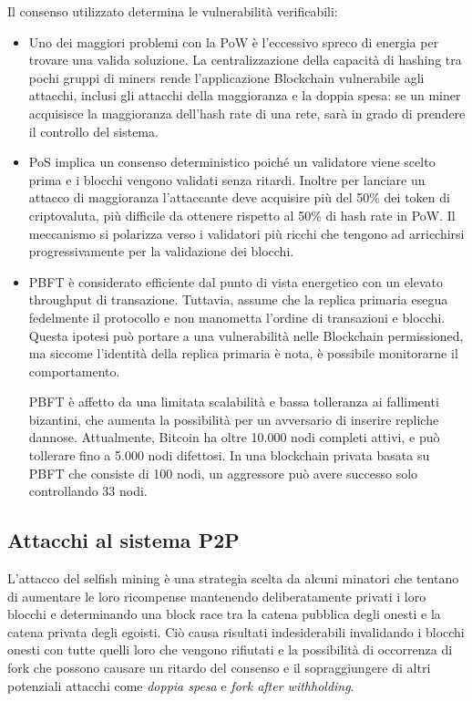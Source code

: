 Il consenso utilizzato determina le vulnerabilità verificabili:
\begin{itemize}
    \item Uno dei maggiori problemi con la PoW è l'eccessivo spreco di energia per trovare una valida soluzione. La centralizzazione della capacità di hashing tra pochi gruppi di miners rende l'applicazione Blockchain vulnerabile agli attacchi, inclusi gli attacchi della maggioranza e la doppia spesa: se un miner acquisisce la maggioranza dell'hash rate di una rete, sarà in grado di prendere il controllo del sistema.
    \item PoS implica un consenso deterministico poiché un validatore viene scelto prima e i blocchi vengono validati senza ritardi. Inoltre per lanciare un attacco di maggioranza l'attaccante deve acquisire più del 50\% dei token di criptovaluta, più difficile da ottenere rispetto al 50\% di hash rate in PoW. Il meccanismo si polarizza verso i validatori più ricchi che tengono ad arricchirsi progressivamente per la validazione dei blocchi.
    \item PBFT è considerato efficiente dal punto di vista energetico con un elevato throughput di transazione. Tuttavia, assume che la replica primaria esegua fedelmente il protocollo e non manometta l'ordine di transazioni e blocchi. Questa ipotesi può portare a una vulnerabilità nelle Blockchain permissioned, ma siccome l'identità della replica primaria è nota, è possibile monitorarne il comportamento.
    
    PBFT è affetto da una limitata scalabilità e bassa tolleranza ai fallimenti bizantini, che aumenta la possibilità per un avversario di inserire repliche dannose. Attualmente, Bitcoin ha oltre 10.000 nodi completi attivi, e può tollerare fino a 5.000 nodi difettosi. In una blockchain privata basata su PBFT che consiste di 100 nodi, un aggressore può avere successo solo controllando 33 nodi.
\end{itemize}

\subsection{Attacchi al sistema P2P}

L'attacco del selfish mining è una strategia scelta da alcuni minatori che tentano di aumentare le loro ricompense mantenendo deliberatamente privati i loro blocchi e determinando una block race tra la catena pubblica degli onesti e la catena privata degli egoisti. Ciò causa risultati indesiderabili invalidando i blocchi onesti con tutte quelli loro che vengono rifiutati e la possibilità di occorrenza di fork che possono causare un ritardo del consenso e il sopraggiungere di altri potenziali attacchi come \textit{doppia spesa} e \textit{fork after withholding}.

